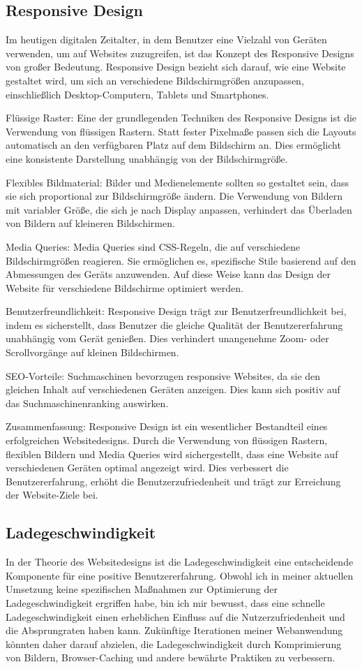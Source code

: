 \documentclass[fontsize=12pt,openright,oneside,paper=a4,BCOR=1cm]{scrbook}
\begin{document}
\subsection{Responsive Design}
Im heutigen digitalen Zeitalter, in dem Benutzer eine Vielzahl von Geräten verwenden, um auf Websites zuzugreifen, ist das Konzept des Responsive Designs von großer Bedeutung. Responsive Design bezieht sich darauf, wie eine Website gestaltet wird, um sich an verschiedene Bildschirmgrößen anzupassen, einschließlich Desktop-Computern, Tablets und Smartphones.

Flüssige Raster: Eine der grundlegenden Techniken des Responsive Designs ist die Verwendung von flüssigen Rastern. Statt fester Pixelmaße passen sich die Layouts automatisch an den verfügbaren Platz auf dem Bildschirm an. Dies ermöglicht eine konsistente Darstellung unabhängig von der Bildschirmgröße.

Flexibles Bildmaterial: Bilder und Medienelemente sollten so gestaltet sein, dass sie sich proportional zur Bildschirmgröße ändern. Die Verwendung von Bildern mit variabler Größe, die sich je nach Display anpassen, verhindert das Überladen von Bildern auf kleineren Bildschirmen.

Media Queries: Media Queries sind CSS-Regeln, die auf verschiedene Bildschirmgrößen reagieren. Sie ermöglichen es, spezifische Stile basierend auf den Abmessungen des Geräts anzuwenden. Auf diese Weise kann das Design der Website für verschiedene Bildschirme optimiert werden.

Benutzerfreundlichkeit: Responsive Design trägt zur Benutzerfreundlichkeit bei, indem es sicherstellt, dass Benutzer die gleiche Qualität der Benutzererfahrung unabhängig vom Gerät genießen. Dies verhindert unangenehme Zoom- oder Scrollvorgänge auf kleinen Bildschirmen.

SEO-Vorteile: Suchmaschinen bevorzugen responsive Websites, da sie den gleichen Inhalt auf verschiedenen Geräten anzeigen. Dies kann sich positiv auf das Suchmaschinenranking auswirken.

Zusammenfassung:
Responsive Design ist ein wesentlicher Bestandteil eines erfolgreichen Websitedesigns. Durch die Verwendung von flüssigen Rastern, flexiblen Bildern und Media Queries wird sichergestellt, dass eine Website auf verschiedenen Geräten optimal angezeigt wird. Dies verbessert die Benutzererfahrung, erhöht die Benutzerzufriedenheit und trägt zur Erreichung der Website-Ziele bei.

\subsection{Ladegeschwindigkeit}
In der Theorie des Websitedesigns ist die Ladegeschwindigkeit eine entscheidende Komponente für eine positive Benutzererfahrung. Obwohl ich in meiner aktuellen Umsetzung keine spezifischen Maßnahmen zur Optimierung der Ladegeschwindigkeit ergriffen habe, bin ich mir bewusst, dass eine schnelle Ladegeschwindigkeit einen erheblichen Einfluss auf die Nutzerzufriedenheit und die Absprungraten haben kann. Zukünftige Iterationen meiner Webanwendung könnten daher darauf abzielen, die Ladegeschwindigkeit durch Komprimierung von Bildern, Browser-Caching und andere bewährte Praktiken zu verbessern.
\end{document}
